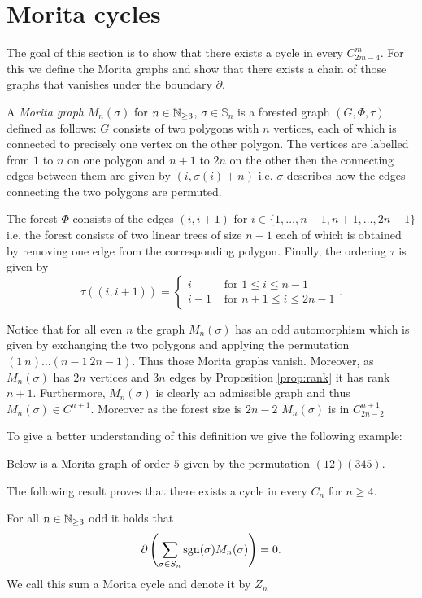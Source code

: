 \section{Morita cycles}\label{sec:MoritaClasses}
The goal of this section is to show that there exists a cycle in every $C^{m}_{2m-4}$.
For this we define the Morita graphs and show that there exists a chain of those graphs that vanishes under the boundary $\partial$.

\begin{definition}
	A \emph{Morita graph} $M_{n}(\sigma)$ for $n \in \mathbb{N}_{\geq 3}$, $\sigma \in \mathbb{S}_{n}$ is a forested graph $(G,\Phi,\tau)$ defined as follows:
	$G$ consists of two polygons with $n$ vertices, each of which is connected to precisely one vertex on the other polygon.
	The vertices are labelled from $1$ to $n$ on one polygon and $n+1$ to $2n$ on the other then the connecting edges between them are given by $(i,\sigma(i)+n)$ i.e.
	$\sigma$ describes how the edges connecting the two polygons are permuted.

	The forest $\Phi$ consists of the edges $(i,i+1)$ for $i \in \{1,\ldots,n-1, n+1,\ldots,2n-1\}$ i.e. the
	forest consists of two linear trees of size $n-1$ each of which is obtained by removing one edge from the corresponding polygon.
	Finally, the ordering $\tau$ is given by
	\[
		\tau((i,i+1)) = \begin{cases}
			i & \text{ for } 1 \leq i \leq n-1\\ 
			i-1 & \text{ for } n+1 \leq i \leq 2n-1
		\end{cases}
	.\] 
\end{definition}
Notice that for all even $n$ the graph $M_{n}(\sigma)$ has an odd automorphism which is given by exchanging the two polygons and applying the permutation $(1\ n) \ldots (n-1\ 2n -1)$.
Thus those Morita graphs vanish.
Moreover, as $M_{n}(\sigma)$ has $2n$ vertices and $3n$ edges by Proposition \ref{prop:rank} it has rank $n+1$.
Furthermore, $M_{n}(\sigma)$ is clearly an admissible graph and thus $M_{n}(\sigma) \in C^{n+1}$. Moreover as the forest size is $2n-2$ $M_{n}(\sigma)$ is in $C^{n+1}_{2n -2}$

To give a better understanding of this definition we give the following example:

\begin{eg}
	Below is a Morita graph of order $5$ given by the permutation $(12)(345)$.
\end{eg}

The following result proves that there exists a cycle in every $C_{n}$ for $n \geq 4$.
\begin{theorem}
	For all $n \in \mathbb{N}_{\geq 3}$ odd it holds that 
	\[
		\partial\left(\sum_{\sigma \in S_{n}} \operatorname{sgn}(\sigma) M_{n}(\sigma)\right) = 0
	.\] 
	We call this sum a Morita cycle and denote it by $Z_{n}$
\end{theorem}

